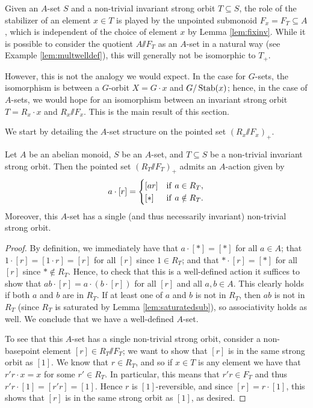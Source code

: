 \documentclass[11pt]{amsart}
\renewcommand{\ss}{\mathord{\sslash}}
\begin{document}
Given an $A$-set $S$ and a non-trivial invariant strong orbit $T\subseteq S$, the role of the stabilizer of an element $x\in T$ is played by the unpointed submonoid $F_x=F_T\subseteq A$, which is independent of the choice of element $x$ by Lemma \ref{lem:fixinv}. While it is possible to consider the quotient $A\ss F_T$ as an $A$-set in a natural way (see Example \ref{lem:multwelldef}), this will generally not be isomorphic to $T_+$. 

However, this is not the analogy we would expect. In the case for $G$-sets, the isomorphism is between a $G$-orbit $X=G\cdot x$ and $G/\operatorname{Stab}(x)$; hence, in the case of $A$-sets, we would hope for an isomorphism between an invariant strong orbit $T=R_x\cdot x$ and $R_x\ss F_x$. This is the main result of this section.

We start by detailing the $A$-set structure on the pointed set $(R_x\ss F_x)_+$.

\begin{proposition}\label{R/TasAset}
     Let $A$ be an abelian monoid, $S$ be an $A$-set, and $T\subseteq S$ be a non-trivial invariant strong orbit. Then the pointed set $(R_T\ss F_T)_+$ admits an $A$-action given by \[a \cdot [r] = \begin{cases}
            [ar] &\mathrm{if}\  a \in R_T, \\
            [*] &\mathrm{if}\  a \notin R_T.
    \end{cases}\] Moreover, this $A$-set has a single (and thus necessarily invariant) non-trivial strong orbit.
\end{proposition}
\begin{proof}
  By definition, we immediately have that $a\cdot [*]=[*]$ for all $a\in A$; that $1\cdot [r]=[1\cdot r]=[r]$ for all $[r]$ since $1\in R_T$; and that $*\cdot [r]=[*]$ for all $[r]$ since $*\notin R_T$. Hence, to check that this is a well-defined action it suffices to show that $ab \cdot [r] = a\cdot (b\cdot [r])$ for all $[r]$ and all $a,b\in A$. This clearly holds if both $a$ and $b$ are in $R_T$. If at least one of $a$ and $b$ is not in $R_T$, then $ab$ is not in $R_T$ (since $R_T$ is saturated by Lemma \ref{lem:saturatedsub}), so associativity holds as well. We conclude that we have a well-defined $A$-set.  
  
  To see that this $A$-set has a single non-trivial strong orbit, consider a non-basepoint element $[r]\in R_T\ss F_T$; we want to show that $[r]$ is in the same strong orbit as $[1]$. We know that $r\in R_T$, and so if $x\in T$ is any element we have that $r'r\cdot x=x$ for some $r'\in R_T$. In particular, this means that $r'r\in F_T$ and thus $r'r\cdot [1]=[r'r]=[1]$. Hence $r$ is $[1]$-reversible, and since $[r]=r\cdot [1]$, this shows that $[r]$ is in the same strong orbit as $[1]$, as desired.
\end{proof}
\end{document}
